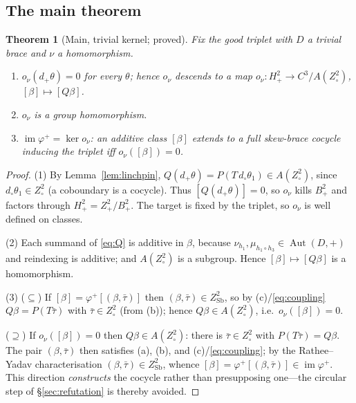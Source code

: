 \documentclass[11pt,reqno]{amsart}
\theoremstyle{plain}
\newtheorem{theorem}{Theorem}[section]
\theoremstyle{definition}
\newcommand{\Sb}{\mathrm{Sb}}
\newcommand{\im}{\operatorname{im}}
\newcommand{\Aut}{\operatorname{Aut}}
\begin{document}
\subsection{The main theorem}

\begin{theorem}[Main, trivial kernel; proved]\label{thm:main-triv}
Fix the good triplet with $D$ a trivial brace and $\nu$ a homomorphism.
\begin{enumerate}\itemsep2pt
\item[\rm(1)] $o_\nu(d_+\theta)=0$ for every $\theta$; hence $o_\nu$ descends to a map
$o_\nu\colon H^2_+\to C^3/A(Z^2_\circ)$, $[\beta]\mapsto[Q\beta]$.
\item[\rm(2)] $o_\nu$ is a group homomorphism.
\item[\rm(3)] $\im\varphi^{+}=\ker o_\nu$: an additive class $[\beta]$ extends to a full
skew-brace cocycle inducing the triplet iff $o_\nu([\beta])=0$.
\end{enumerate}
\end{theorem}
\begin{proof}
(1) By Lemma~\ref{lem:linchpin}, $Q(d_+\theta)=P(T\,d_\circ\theta_1)\in A(Z^2_\circ)$, since
$d_\circ\theta_1\in Z^2_\circ$ (a coboundary is a cocycle). Thus $[Q(d_+\theta)]=0$, so
$o_\nu$ kills $B^2_+$ and factors through $H^2_+=Z^2_+/B^2_+$. The target is fixed by the
triplet, so $o_\nu$ is well defined on classes.

(2) Each summand of \eqref{eq:Q} is additive in $\beta$, because
$\nu_{h_1},\mu_{h_1\circ h_3}\in\Aut(D,+)$ and reindexing is additive; and
$A(Z^2_\circ)$ is a subgroup. Hence $[\beta]\mapsto[Q\beta]$ is a homomorphism.

(3) ($\subseteq$) If $[\beta]=\varphi^{+}[(\beta,\bar\tau)]$ then $(\beta,\bar\tau)\in
Z^2_{\Sb}$, so by (c)/\eqref{eq:coupling} $Q\beta=P(T\bar\tau)$ with $\bar\tau\in
Z^2_\circ$ (from (b)); hence $Q\beta\in A(Z^2_\circ)$, i.e.\ $o_\nu([\beta])=0$.

($\supseteq$) If $o_\nu([\beta])=0$ then $Q\beta\in A(Z^2_\circ)$: there is $\bar\tau\in
Z^2_\circ$ with $P(T\bar\tau)=Q\beta$. The pair $(\beta,\bar\tau)$ then satisfies (a), (b),
and (c)/\eqref{eq:coupling}; by the Rathee--Yadav characterisation
$(\beta,\bar\tau)\in Z^2_{\Sb}$, whence $[\beta]=\varphi^{+}[(\beta,\bar\tau)]\in
\im\varphi^{+}$. This direction \emph{constructs} the cocycle rather than presupposing
one---the circular step of \S\ref{sec:refutation} is thereby avoided.
\end{proof}
\end{document}

